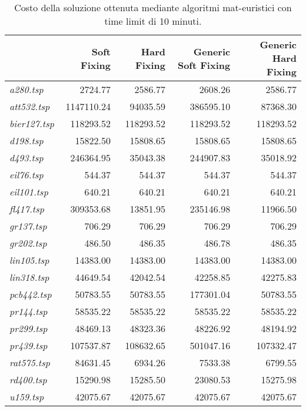 {\footnotesize
\begin{longtable}[H]{lrrrr}
\caption{Costo della soluzione ottenuta mediante algoritmi mat-euristici con time limit di 10 minuti.}\\
\hline
{} & \textbf{Soft Fixing} & \textbf{Hard Fixing} & \textbf{Generic Soft Fixing} & \textbf{Generic Hard Fixing}\\
\hline
\textit{a280.tsp} & 2724.77 & 2586.77 & 2608.26 & 2586.77\\
\textit{att532.tsp} & 1147110.24 & 94035.59 & 386595.10 & 87368.30\\
\textit{bier127.tsp} & 118293.52 & 118293.52 & 118293.52 & 118293.52\\
\textit{d198.tsp} & 15822.50 & 15808.65 & 15808.65 & 15808.65\\
\textit{d493.tsp} & 246364.95 & 35043.38 & 244907.83 & 35018.92\\
\textit{eil76.tsp} & 544.37 & 544.37 & 544.37 & 544.37\\
\textit{eil101.tsp} & 640.21 & 640.21 & 640.21 & 640.21\\
\textit{fl417.tsp} & 309353.68 & 13851.95 & 235146.98 & 11966.50\\
\textit{gr137.tsp} & 706.29 & 706.29 & 706.29 & 706.29\\
\textit{gr202.tsp} & 486.50 & 486.35 & 486.78 & 486.35\\
\textit{lin105.tsp} & 14383.00 & 14383.00 & 14383.00 & 14383.00\\
\textit{lin318.tsp} & 44649.54 & 42042.54 & 42258.85 & 42275.83\\
\textit{pcb442.tsp} & 50783.55 & 50783.55 & 177301.04 & 50783.55\\
\textit{pr144.tsp} & 58535.22 & 58535.22 & 58535.22 & 58535.22\\
\textit{pr299.tsp} & 48469.13 & 48323.36 & 48226.92 & 48194.92\\
\textit{pr439.tsp} & 107537.87 & 108632.65 & 501047.16 & 107332.47\\
\textit{rat575.tsp} & 84631.45 & 6934.26 & 7533.38 & 6799.55\\
\textit{rd400.tsp} & 15290.98 & 15285.50 & 23080.53 & 15275.98\\
\textit{u159.tsp} & 42075.67 & 42075.67 & 42075.67 & 42075.67\\
\hline
\end{longtable}
}

